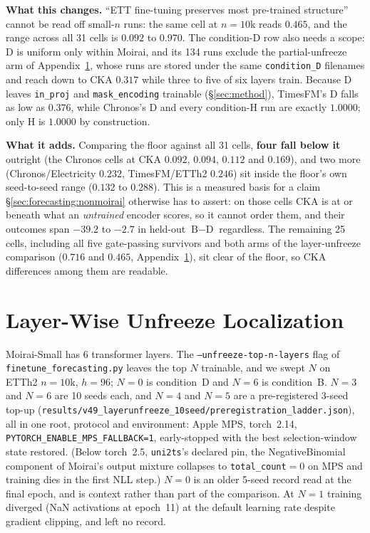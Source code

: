 \textbf{What this changes.}  ``ETT fine-tuning preserves most pre-trained
structure'' cannot be read off small-$n$ runs: the same cell at $n{=}10$k reads
$0.465$, and the range across all 31 cells is $0.092$ to $0.970$.  The condition-D row also
needs a scope: D is uniform only within Moirai, and its 134 runs exclude the
partial-unfreeze arm of Appendix~\ref{app:layerunfreeze}, whose runs are stored
under the same \texttt{condition\_D} filenames and reach down to CKA $0.317$
while three to five of six layers train.  Because D leaves \texttt{in\_proj}
and \texttt{mask\_encoding} trainable (\S\ref{sec:method}), TimesFM's D falls as
low as $0.376$, while Chronos's D and every condition-H run are exactly $1.0000$;
only H is $1.0000$ by construction.

\textbf{What it adds.}  Comparing the floor against all 31 cells,
\textbf{four fall below it} outright (the Chronos cells at
CKA $0.092$, $0.094$, $0.112$ and $0.169$), and two more (Chronos/Electricity
$0.232$, TimesFM/ETTh2 $0.246$) sit inside the floor's own seed-to-seed range
($0.132$ to $0.288$).  This is a measured basis for a claim
\S\ref{sec:forecasting:nonmoirai} otherwise has to assert: on those cells CKA is
at or beneath what an \emph{untrained} encoder scores, so it cannot order them,
and their outcomes span $-39.2$ to $-2.7$ in held-out $\text{B}{-}\text{D}$
regardless.  The remaining 25 cells, including all five gate-passing survivors and
both arms of the layer-unfreeze comparison ($0.716$ and $0.465$,
Appendix~\ref{app:layerunfreeze}), sit clear of the floor, so CKA differences
among them are readable.

\section{Layer-Wise Unfreeze Localization}
\label{app:layerunfreeze}

Moirai-Small has 6 transformer layers.  The \texttt{--unfreeze-top-n-layers} flag
of \texttt{finetune\_forecasting.py} leaves the top $N$ trainable, and we swept
$N$ on ETTh2 $n{=}10$k, $h{=}96$; $N{=}0$ is condition~D and $N{=}6$ is
condition~B.  $N{=}3$ and $N{=}6$ are 10 seeds each, and $N{=}4$ and $N{=}5$ are a
pre-registered 3-seed top-up
(\texttt{results/v49\_layerunfreeze\_10seed/preregistration\_ladder.json}), all in
one root, protocol and environment: Apple MPS, torch~2.14,
\texttt{PYTORCH\_ENABLE\_MPS\_FALLBACK=1}, early-stopped with the best
selection-window state restored.  (Below torch~2.5, \texttt{uni2ts}'s declared pin,
the NegativeBinomial component of Moirai's output mixture collapses to
\texttt{total\_count}${=}0$ on MPS and training dies in the first NLL step.)
$N{=}0$ is an older 5-seed record read at the final epoch, and is context rather
than part of the comparison.  At $N{=}1$ training diverged (NaN activations at
epoch~11) at the default learning rate despite gradient clipping, and left no
record.

